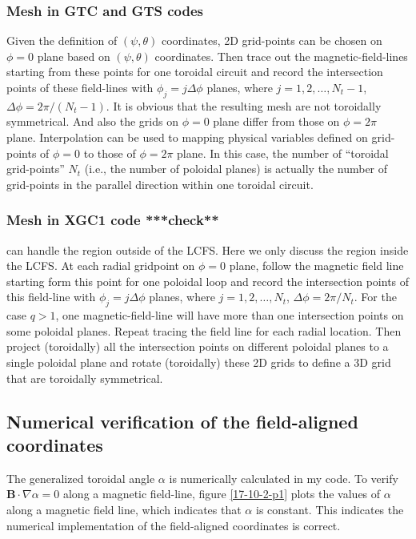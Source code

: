 \documentclass{llncs}
\begin{document}
\subsubsection{Mesh in GTC and GTS codes{\cite{wxwang2006}}}

Given the definition of $(\psi, \theta)$ coordinates, 2D grid-points can be
chosen on $\phi = 0$ plane based on $(\psi, \theta)$ coordinates. Then trace
out the magnetic-field-lines starting from these points for one toroidal
circuit and record the intersection points of these field-lines with $\phi_j =
j \Delta \phi$ planes, where $j = 1, 2, \ldots, N_t - 1$, $\Delta \phi = 2 \pi
/ (N_t - 1)$. It is obvious that the resulting mesh are not toroidally
symmetrical. And also the grids on $\phi = 0$ plane differ from those on $\phi
= 2 \pi$ plane. Interpolation can be used to mapping physical variables
defined on grid-points of $\phi = 0$ to those of $\phi = 2 \pi$ plane. In this
case, the number of ``toroidal grid-points'' $N_t$ (i.e., the number of
poloidal planes) is actually the number of grid-points in the parallel
direction within one toroidal circuit.

\subsubsection{Mesh in XGC1 code ***check**}

{} can handle the region outside of the LCFS. Here we only
discuss the region inside the LCFS. At each radial gridpoint on $\phi = 0$
plane, follow the magnetic field line starting form this point for one
poloidal loop and record the intersection points of this field-line with
$\phi_j = j \Delta \phi$ planes, where $j = 1, 2, \ldots, N_t$, $\Delta \phi =
2 \pi / N_t$. For the case $q > 1$, one magnetic-field-line will have more
than one intersection points on some poloidal planes. Repeat tracing the field
line for each radial location. Then project (toroidally) all the intersection
points on different poloidal planes to a single poloidal plane and rotate
(toroidally) these 2D grids to define a 3D grid that are toroidally
symmetrical.

\subsection{Numerical verification of the field-aligned coordinates}

The generalized toroidal angle $\alpha$ is numerically calculated in my code.
To verify $\mathbf{B} \cdot \nabla \alpha = 0$ along a magnetic field-line,
figure \ref{17-10-2-p1} plots the values of $\alpha$ along a magnetic field
line, which indicates that $\alpha$ is constant. This indicates the numerical
implementation of the field-aligned coordinates is correct.
\end{document}
